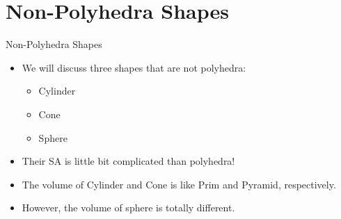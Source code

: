 \section{Non-Polyhedra Shapes}
\begin{frame}[t]{Non-Polyhedra Shapes}
    \begin{itemize}
        \item We will discuss three shapes that are not polyhedra:
        \begin{itemize}
            \item Cylinder
            \item Cone
            \item Sphere
        \end{itemize}
    \end{itemize}
    \begin{itemize}
        \item Their SA is little bit complicated than polyhedra!
        \item The volume of Cylinder and Cone is like Prim and Pyramid, respectively.
        \item However, the volume of sphere is totally different.
    \end{itemize}
    \begin{figure}[H]
        \centering
        
    \end{figure}
\end{frame}


